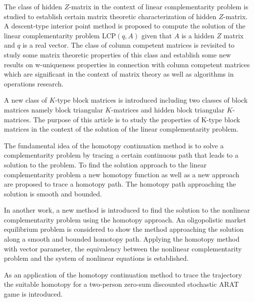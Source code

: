 \documentclass{article}
\begin{document}
The class of hidden $Z$-matrix in the context of linear complementarity problem is studied to establish certain matrix theoretic characterization of hidden $Z$-matrix. A descent-type interior point method is proposed to compute the solution of the linear complementarity problem LCP$(q, A)$ given that $A$ is a hidden $Z$ matrix and $q$ is a real vector. The class of column competent matrices is revisited to study some matrix theoretic properties of this class and establish some new results on w-uniqueness properties in connection with column competent matrices which are significant in the context of matrix theory as well as algorithms in operations research.

A new class of $K$-type block matrices is introduced including two classes of block matrices namely block triangular $K$-matrices and hidden block triangular $K$-matrices. The purpose of this article is to study the properties of K-type block matrices in the context of the solution of the linear complementarity problem.

The fundamental idea of the homotopy continuation method is to solve a complementarity problem by tracing a certain continuous path that leads to a solution to the problem. To find the solution approach to the linear complementarity problem a new homotopy function as well as a new approach are proposed to trace a homotopy path. The homotopy path approaching the solution is smooth and bounded.

In another work, a new method is introduced to find the solution to the nonlinear complementarity problem using the homotopy approach. An oligopolistic market equilibrium problem is considered to show the method approaching the solution along a smooth and bounded homotopy path. Applying the homotopy method with vector parameter, the equivalency between the nonlinear complementarity problem and the system of nonlinear equations is established.

As an application of the homotopy continuation method to trace the trajectory the suitable homotopy for a two-person zero-sum discounted stochastic ARAT game is introduced.
 
\end{document}
